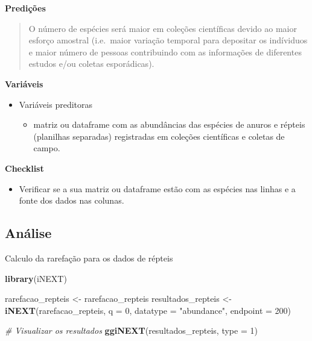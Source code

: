\documentclass[
]{book}
\newenvironment{Shaded}{\begin{snugshade}}{\end{snugshade}}
\newcommand{\CommentTok}[1]{\textcolor[rgb]{0.56,0.35,0.01}{\textit{#1}}}
\newcommand{\DataTypeTok}[1]{\textcolor[rgb]{0.13,0.29,0.53}{#1}}
\newcommand{\DecValTok}[1]{\textcolor[rgb]{0.00,0.00,0.81}{#1}}
\newcommand{\KeywordTok}[1]{\textcolor[rgb]{0.13,0.29,0.53}{\textbf{#1}}}
\newcommand{\NormalTok}[1]{#1}
\newcommand{\StringTok}[1]{\textcolor[rgb]{0.31,0.60,0.02}{#1}}
\providecommand{\tightlist}{%
  \setlength{\itemsep}{0pt}\setlength{\parskip}{0pt}}
\begin{document}
\textbf{Predições}

\begin{quote}
O número de espécies será maior em coleções científicas devido ao maior esforço amostral (i.e.~maior variação temporal para depositar os indíviduos e maior número de pessoas contribuindo com as informações de diferentes estudos e/ou coletas esporádicas).
\end{quote}

\textbf{Variáveis}

\begin{itemize}
\tightlist
\item
  Variáveis preditoras

  \begin{itemize}
  \tightlist
  \item
    matriz ou dataframe com as abundâncias das espécies de anuros e répteis (planilhas separadas) registradas em coleções científicas e coletas de campo.
  \end{itemize}
\end{itemize}

\textbf{Checklist}

\begin{itemize}
\tightlist
\item
  Verificar se a sua matriz ou dataframe estão com as espécies nas linhas e a fonte dos dados nas colunas.
\end{itemize}

\hypertarget{anuxe1lise-1}{%
\subsection{Análise}\label{anuxe1lise-1}}

Calculo da rarefação para os dados de répteis

\begin{Shaded}
\begin{Highlighting}[]
\KeywordTok{library}\NormalTok{(iNEXT)}

\NormalTok{rarefacao_repteis <-}\StringTok{ }\NormalTok{rarefacao_repteis}
\NormalTok{resultados_repteis <-}\StringTok{ }\KeywordTok{iNEXT}\NormalTok{(rarefacao_repteis, }\DataTypeTok{q =} \DecValTok{0}\NormalTok{, }\DataTypeTok{datatype =} \StringTok{"abundance"}\NormalTok{, }\DataTypeTok{endpoint =} \DecValTok{200}\NormalTok{)}

\CommentTok{# Visualizar os resultados }
\KeywordTok{ggiNEXT}\NormalTok{(resultados_repteis, }\DataTypeTok{type =} \DecValTok{1}\NormalTok{)}
\end{Highlighting}
\end{Shaded}
\end{document}
